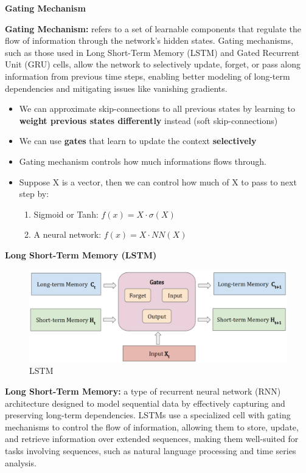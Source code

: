 \textbf{Gating Mechanism}

\begin{definition}
     \textbf{Gating Mechanism:} refers to a set of learnable components that regulate the flow of information through the network's hidden states. Gating mechanisms, such as those used in Long Short-Term Memory (LSTM) and Gated Recurrent Unit (GRU) cells, allow the network to selectively update, forget, or pass along information from previous time steps, enabling better modeling of long-term dependencies and mitigating issues like vanishing gradients.
\end{definition}

\begin{itemize}
    \item We can approximate skip-connections to all previous states by learning to \textbf{weight
previous states differently} instead (soft skip-connections)
\item We can use \textbf{gates }that learn to update the context \textbf{selectively}
\item Gating mechanism controls how much informations flows through.
\item Suppose X is a vector, then we can control how much of X to pass to next step by:
\begin{enumerate}
    \item Sigmoid or Tanh: \(f(x) = X \cdot \sigma(X)\)
    \item A neural network: \( f(x) = X \cdot NN(X) \)
\end{enumerate}
\end{itemize}

\noindent\textbf{Long Short-Term Memory (LSTM)}

\begin{figure}[h!t]
    \centering
    \includegraphics[width=0.65\linewidth]{lstm.png}
    \caption{LSTM}
    \label{fig:enter-label}
\end{figure}

\begin{definition}
    \textbf{Long Short-Term Memory:} a type of recurrent neural network (RNN) architecture designed to model sequential data by effectively capturing and preserving long-term dependencies. LSTMs use a specialized cell with gating mechanisms to control the flow of information, allowing them to store, update, and retrieve information over extended sequences, making them well-suited for tasks involving sequences, such as natural language processing and time series analysis.
\end{definition}


